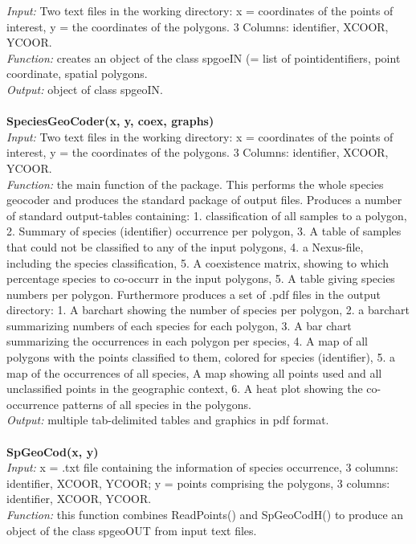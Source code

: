\documentclass[a4paper,titlepage,11pt]{scrreprt}
\begin{document}
\textit{Input:} Two text files in the working directory: x = coordinates of the points of interest, y = the coordinates of the polygons. 3 Columns: identifier, XCOOR, YCOOR.\\
\textit{Function:} creates an object of the class spgoeIN (= list of pointidentifiers, point coordinate, spatial polygons.\\
\textit{Output:} object of class spgeoIN.\\
\\
\textbf{SpeciesGeoCoder(x, y, coex, graphs)}\\
\textit{Input:} Two text files in the working directory: x = coordinates of the points of interest, y = the coordinates of the polygons. 3 Columns: identifier, XCOOR, YCOOR.\\
\textit{Function:} the main function of the package. This performs the whole species geocoder and produces the standard package of output files. Produces a number of standard output-tables containing: 1. classification of all samples to a polygon, 2. Summary of species (identifier) occurrence per polygon, 3. A table of samples that could not be classified to any of the input polygons, 4. a Nexus-file, including the species classification, 5. A coexistence matrix, showing to which percentage species to co-occurr in the input polygons, 5. A table giving species numbers per polygon. Furthermore produces a set of .pdf files in the output directory: 1. A barchart showing the number of species per polygon, 2. a barchart summarizing numbers of each species for each polygon, 3. A bar chart summarizing the occurrences in each polygon per species, 4. A map of all polygons with the points classified to them, colored for species (identifier), 5. a map of the occurrences of all species, A map showing all points used and all unclassified points in the geographic context, 6. A heat plot showing the co-occurrence patterns of all species in the polygons.\\
\textit{Output:} multiple tab-delimited tables and graphics in pdf format.\\
\\
\textbf{SpGeoCod(x, y)}\\
\textit{Input:} x = .txt file containing the information of species occurrence, 3 columns: identifier, XCOOR, YCOOR; y = points comprising the polygons, 3 columns: identifier, XCOOR, YCOOR.\\
\textit{Function:} this function combines ReadPoints() and SpGeoCodH() to produce an object of the class spgeoOUT from input text files.\\
\end{document}
